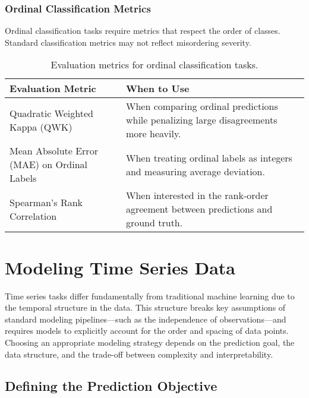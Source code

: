 \documentclass[12pt,openany, draft]{book}
\begin{document}
\subsection{Ordinal Classification Metrics}

Ordinal classification tasks require metrics that respect the 
order of classes. Standard classification metrics may not reflect 
misordering severity.

\begin{table}[H]
    \centering
    \small
    \renewcommand{\arraystretch}{1.3}
    \begin{tabular}{|l|p{9cm}|}
        \hline
        \textbf{Evaluation Metric} & \textbf{When to Use} \\
        \hline
        Quadratic Weighted Kappa (QWK) & When comparing ordinal predictions while penalizing large disagreements more heavily. \\
        \hline
        Mean Absolute Error (MAE) on Ordinal Labels & When treating ordinal labels as integers and measuring average deviation. \\
        \hline
        Spearman's Rank Correlation & When interested in the rank-order agreement between predictions and ground truth. \\
        \hline
    \end{tabular}
    \caption{Evaluation metrics for ordinal classification tasks.}
\end{table}




\chapter{Modeling Time Series Data}

Time series tasks differ fundamentally from traditional machine learning due to the temporal structure in the data. This structure breaks key assumptions of standard modeling pipelines—such as the independence of observations—and requires models to explicitly account for the order and spacing of data points. Choosing an appropriate modeling strategy depends on the prediction goal, the data structure, and the trade-off between complexity and interpretability.



\section{Defining the Prediction Objective}
\end{document}
